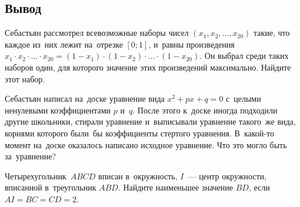 \subsection*{Вывод}

\begin{problems}

\item
Себастьян рассмотрел всевозможные наборы чисел $(x_{1}, x_{2}, \ldots, x_{20})$
такие, что каждое из~них лежит на~отрезке $[0;
1]$, и~равны произведения
\(
    x_{1} \cdot x_{2} \cdot \ldots \cdot x_{20}
=
    (1 - x_{1}) \cdot (1 - x_{2}) \cdot \ldots \cdot (1 - x_{20})
\).
Он выбрал среди таких наборов один, для которого значение этих произведений
максимально.
Найдите этот набор.

\item
Себастьян написал на~доске уравнение вида $x^2 + p x + q = 0$ с~целыми
ненулевыми коэффициентами $p$ и~$q$.
После этого к~доске иногда подходили другие школьники, стирали уравнение
и~выписывали уравнение такого~же вида, корнями которого были~бы коэффициенты
стертого уравнения.
В~какой-то момент на~доске оказалось написано исходное уравнение.
Что это могло быть за~уравнение?

\item
Четырехугольник~$ABCD$ вписан в~окружность, $I$~--- центр окружности, вписанной
в~треугольник $ABD$.
Найдите наименьшее значение $BD$, если $AI = BC = CD = 2$.

\end{problems}

